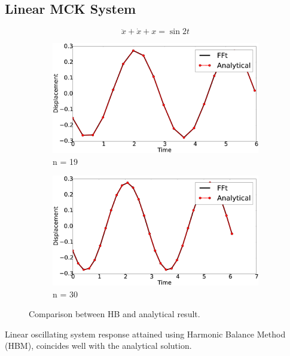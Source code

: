 \documentclass[12pt, a4paper]{extarticle}
\begin{document}
\subsection{Linear MCK System}

\begin{equation}
	\ddot{x} + \dot{x} + x = \sin 2t
\end{equation}
\begin{figure}[H]
	\centering
	\begin{subfigure}[h]{8.0 cm}
		\includegraphics[width=8.0 cm]{figure/1N19.eps}
		\caption{n = 19}
	\end{subfigure}
	\begin{subfigure}[h]{8.0 cm}
        \includegraphics[width=8.0 cm]{figure/1N30.eps}
		\caption{n = 30}
    \end{subfigure}
    \caption{Comparison between HB and analytical result.}
    \label{fig:R1}
\end{figure}
{Linear oscillating system response attained using Harmonic Balance Method (HBM), coincides well with the analytical solution.}
\end{document}
